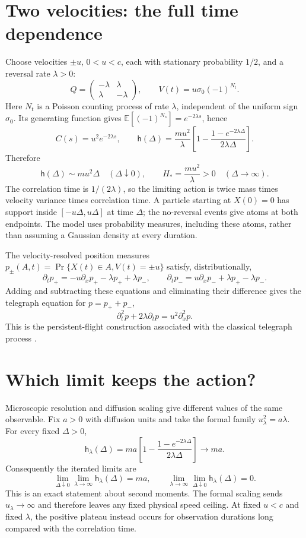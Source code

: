 \documentclass[11pt,a4paper]{article}
\newcommand{\E}{\mathbb E}
\newcommand{\ha}{\mathsf h}
\begin{document}
\section{Two velocities: the full time dependence}
Choose velocities $\pm u$, $0<u<c$, each with stationary probability $1/2$, and a
reversal rate $\lambda>0$:
\[
 Q=\begin{pmatrix}-\lambda&\lambda\\\lambda&-\lambda\end{pmatrix},
 \qquad V(t)=u\sigma_0(-1)^{N_t}.
\]
Here $N_t$ is a Poisson counting process of rate $\lambda$, independent of
the uniform sign $\sigma_0$. Its generating function gives
$\E[(-1)^{N_s}]=e^{-2\lambda s}$, hence
\begin{equation}\label{eq:telegraph}
 C(s)=u^2e^{-2\lambda s},\qquad
 \ha(\Delta)=\frac{mu^2}{\lambda}
 \left[1-\frac{1-e^{-2\lambda\Delta}}{2\lambda\Delta}\right].
\end{equation}
Therefore
\[
 \ha(\Delta)\sim mu^2\Delta\quad(\Delta\downarrow0),\qquad
 H_*=\frac{mu^2}{\lambda}>0\quad(\Delta\to\infty).
\]
The correlation time is $1/(2\lambda)$, so the limiting action is twice
mass times velocity variance times correlation time. A particle starting at
$X(0)=0$ has support inside $[-u\Delta,u\Delta]$ at time $\Delta$;
the no-reversal events give atoms at both endpoints. The model uses probability
measures, including these atoms, rather than assuming a Gaussian density at
every duration.

The velocity-resolved position measures
$p_\pm(A,t)=\Pr\{X(t)\in A,V(t)=\pm u\}$ satisfy, distributionally,
\[
 \partial_t p_+=-u\partial_xp_+-\lambda p_++\lambda p_-,\qquad
 \partial_t p_-=u\partial_xp_-+\lambda p_+-\lambda p_-.
\]
Adding and subtracting these equations and eliminating their difference gives
the telegraph equation for $p=p_++p_-$,
\[
 \partial_t^2p+2\lambda\partial_tp=u^2\partial_x^2p.
\]
This is the persistent-flight construction associated with the classical
telegraph process \cite[pp.~1--2, (1.1)--(1.3)]{Cinque2022}.

\section{Which limit keeps the action?}
Microscopic resolution and diffusion scaling give different values of the
same observable. Fix $a>0$ with diffusion units and take the formal family
$u_\lambda^2=a\lambda$. For every fixed $\Delta>0$,
\[
 \ha_\lambda(\Delta)=ma
 \left[1-\frac{1-e^{-2\lambda\Delta}}{2\lambda\Delta}\right]
 \longrightarrow ma.
\]
Consequently the iterated limits are
\begin{equation}\label{eq:orders}
 \lim_{\Delta\downarrow0}\lim_{\lambda\to\infty}\ha_\lambda(\Delta)=ma,
 \qquad
 \lim_{\lambda\to\infty}\lim_{\Delta\downarrow0}\ha_\lambda(\Delta)=0.
\end{equation}
This is an exact statement about second moments. The formal scaling sends
$u_\lambda\to\infty$ and therefore leaves any fixed physical speed ceiling.
At fixed $u<c$ and fixed $\lambda$, the positive plateau instead occurs for
observation durations long compared with the correlation time.
\end{document}
